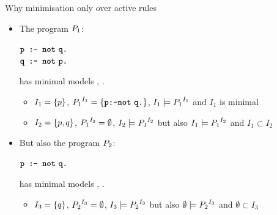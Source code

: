 \documentclass{beamer}
\begin{document}
\begin{frame}{Why minimisation only over active rules}
	\onslide<+->
	
	\begin{itemize}
		\item The program $\prog_1$:
		\begin{center}
			$\code{p :- not}\ \code{q.}$\\
			$\code{q :- not}\ \code{p.}$
		\end{center}
		has minimal models , .
		\onslide<+->
		\begin{itemize}
			\item $I_1 = \set{p}$, $\activerules{I_1}{\prog_1} = \set{\code{p:-not}\ \code{q.}}$, $I_1\models\activerules{I_1}{\prog_1}$ and $I_1$ is minimal\\
			\onslide<+->
			\item $I_2 = \set{p,q}$, $\activerules{I_2}{\prog_1} = \emptyset$, $I_2\models\activerules{I_2}{\prog_1}$ but also $I_1\models\activerules{I_2}{\prog_1}$ and $I_1 \subset I_2$\\
		\end{itemize}
		
		\onslide<+->
		
		\item But also the program $\prog_2$:
		\begin{center}
			$\code{p :- not}\ \code{q.}$
		\end{center}
		has minimal models , {\color{red}}.
		
		\onslide<+->
		
		\begin{itemize}
			\item $I_3 = \set{q}$, $\activerules{I_3}{\prog_2} = \emptyset$, $I_3\models\activerules{I_3}{\prog_2}$ but also $\emptyset\models\activerules{I_3}{\prog_2}$ and $\emptyset \subset I_3$
		\end{itemize}
		
	\end{itemize}
	
\end{frame}
\end{document}
